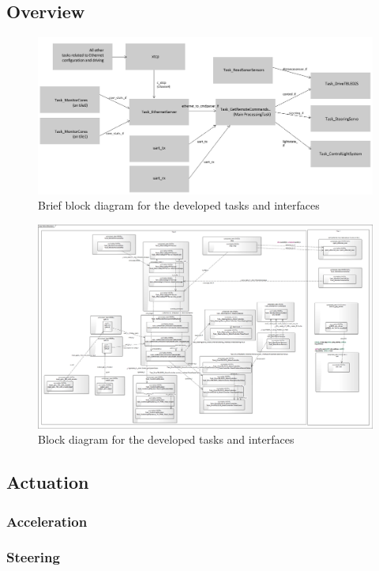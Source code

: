 \subsection{Overview}
\begin{figure}[htb]
	\includegraphics[scale=0.32]{content/images/sysmlxmostasksbrief.png}
	\caption{Brief block diagram for the developed tasks and interfaces}
	\label{fig:sysmlxmostasks}
\end{figure}
\begin{figure}[htb]
	\includegraphics[scale=0.21]{content/images/sysmlxmostasks.png}
	\caption{Block diagram for the developed tasks and interfaces}
	\label{fig:sysmlxmostasks}
\end{figure}
\subsection{Actuation}
\subsubsection{Acceleration}
\subsubsection{Steering}
